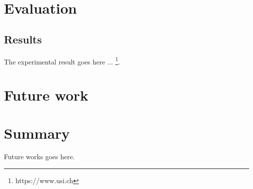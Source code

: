 \documentclass[a4paper]{usiinfbachelorproject}
\begin{document}
\section{\textbf{Evaluation}}
\subsection{\textbf{Results}}
The experimental result goes here ... \footnote{https://www.usi.ch}. \\







\newpage
\section{\textbf{Future work}}

\section{\textbf{Summary}}
Future works goes here.






\newpage



\end{document}
